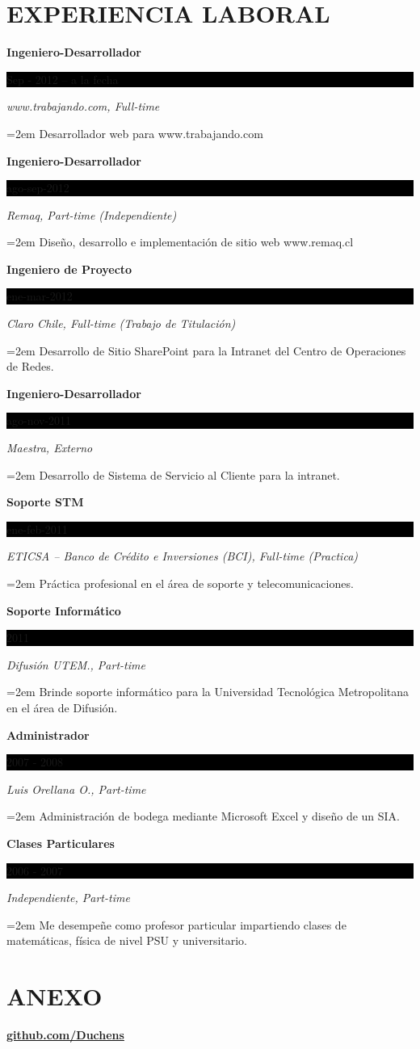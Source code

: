\documentclass[paper=a4,fontsize=11pt]{scrartcl}	 			%
\newcommand{\sepspace}{\vspace*{1em}}			%
\newcommand{\NewPart}[1]{\section*{\uppercase{#1}}}
\newcommand{\EducationEntry}[4]{
		\noindent \textbf{#1} \hfill 					%
		\colorbox{Black}{%
			\parbox{6em}{%
			\hfill\color{White}#2}} \par				%
		\noindent \textit{#3} \par					%
		\noindent\hangindent=2em\hangafter=0 \small #4 	%
		\normalsize \par}
\begin{document}
 
\NewPart{Experiencia Laboral}{}

\EducationEntry{Ingeniero-Desarrollador}{Sep - 2012 -- a la fecha}{www.trabajando.com,  Full-time}{Desarrollador web para  www.trabajando.com}

\sepspace

\EducationEntry{Ingeniero-Desarrollador}{ago-sep-2012}{Remaq,  Part-time (Independiente)}{Diseño, desarrollo e implementación de sitio web www.remaq.cl}

\sepspace

\EducationEntry{Ingeniero de Proyecto}{ene-mar-2012}{Claro Chile,  Full-time (Trabajo de Titulación)}{Desarrollo de Sitio SharePoint para la Intranet del Centro de Operaciones de Redes.}

\sepspace

\EducationEntry{Ingeniero-Desarrollador}{ago-nov-2011}{Maestra, Externo}{Desarrollo de Sistema de Servicio al Cliente para la intranet.}

\sepspace

\EducationEntry{Soporte STM}{ene-feb-2011}{ETICSA – Banco de Crédito e Inversiones (BCI), Full-time (Practica)}{Práctica profesional en el área de soporte y telecomunicaciones.}

 
\sepspace

\EducationEntry{Soporte Informático}{2011}{Difusión UTEM., Part-time}{Brinde soporte informático para la Universidad Tecnológica Metropolitana en el área de Difusión.}

\sepspace

\EducationEntry{Administrador}{2007 - 2008}{Luis Orellana O., Part-time}{Administración de bodega mediante Microsoft Excel y diseño de un SIA.}

\sepspace

\EducationEntry{Clases Particulares}{2006 - 2007}{Independiente, Part-time}{Me desempeñe como profesor particular impartiendo  clases de matemáticas, física de nivel PSU y universitario. }


\NewPart{Anexo}{}
\textbf{\url{github.com/Duchens}}
\end{document}
